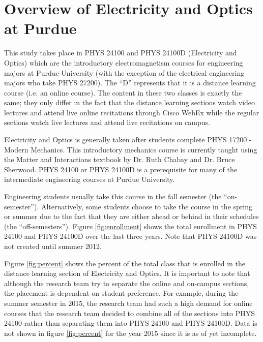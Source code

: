 \section{Overview of Electricity and Optics at Purdue}

This study takes place in PHYS 24100 and PHYS 24100D (Electricity and Optics) which are the introductory electromagnetism courses for engineering majors at Purdue University (with the exception of the electrical engineering majors who take PHYS 27200). The ``D'' represents that it is a distance learning course (i.e. an online course). The content in these two classes is exactly the same; they only differ in the fact that the distance learning sections watch video lectures and attend live online recitations through Cisco WebEx while the regular sections watch live lectures and attend live recitations on campus.

Electricity and Optics is generally taken after students complete PHYS 17200 - Modern Mechanics. This introductory mechanics course is currently taught using the Matter and Interactions textbook by Dr. Ruth Chabay and Dr. Bruce Sherwood\cite{chabay2010}. PHYS 24100 or PHYS 24100D is a prerequisite for many of the intermediate engineering courses at Purdue University.

Engineering students usually take this course in the fall semester (the ``on-semester''). Alternatively, some students choose to take the course in the spring or summer due to the fact that they are either ahead or behind in their schedules (the ``off-semesters''). Figure \ref{fig:enrollment} shows the total enrollment in PHYS 24100 and PHYS 24100D over the last three years. Note that PHYS 24100D was not created until summer 2012.

Figure \ref{fig:percent} shows the percent of the total class that is enrolled in the distance learning section of Electricity and Optics. It is important to note that although the research team try to separate the online and on-campus sections, the placement is dependent on student preference. For example, during the summer semester in 2015, the research team had such a high demand for online courses that the research team decided to combine all of the sections into PHYS 24100 rather than separating them into PHYS 24100 and PHYS 24100D. Data is not shown in figure \ref{fig:percent} for the year 2015 since it is as of yet incomplete.

